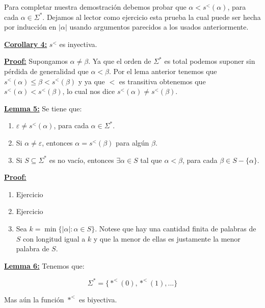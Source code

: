    \par Para completar nuestra demostración debemos probar que $\alpha < s^{<}(\alpha)$, para cada $\alpha \in
    \Sigma ^{\ast}$. Dejamos al lector como ejercicio esta prueba la cual puede ser hecha por inducción en $\left\vert
    \alpha \right\vert$ usando argumentos parecidos a los usados anteriormente.

  \QED


  \textbf{\underline{Corollary 4:}} $s^{<}$ es inyectiva.

  \textbf{\underline{Proof:}} Supongamos $\alpha \neq \beta$. Ya que el orden de $\Sigma^{\ast}$ es total podemos
    suponer sin pérdida de generalidad que $\alpha < \beta$. Por el lema anterior tenemos que $s^{<}(\alpha) \leq \beta
    < s^{<}(\beta)$ y ya que $<$ es transitiva obtenemos que $s^{<}(\alpha)< s^{<}(\beta)$, lo cual nos dice $s^{<}
    (\alpha) \neq s^{<}(\beta)$.

  \QED


  \textbf{\underline{Lemma 5:}} Se tiene que:
    \begin{enumerate}
      \item $\varepsilon \neq s^{<}(\alpha)$, para cada $\alpha \in \Sigma^{\ast}$.
      \item Si $\alpha \neq \varepsilon$, entonces $\alpha = s^{<}(\beta)$ para algún $\beta$.
      \item Si $S\subseteq \Sigma^{\ast}$ es no vacío, entonces $\exists \alpha \in S$ tal que $\alpha < \beta$, para
      cada $\beta \in S-\{\alpha\}$.
    \end{enumerate}

  \textbf{\underline{Proof:}}

    \begin{enumerate}
      \item Ejercicio
      \item Ejercicio
      \item Sea $k = \min \{\left\vert \alpha \right\vert: \alpha \in S\}$. Notese que hay una cantidad finita de
      palabras de $S$ con longitud igual a $k$ y que la menor de ellas es justamente la menor palabra de $S$.
    \end{enumerate}

  \QED


  \textbf{\underline{Lemma 6:}} Tenemos que:

    \[
      \Sigma^{\ast}=\{\ast^{<}(0),\ast^{<}(1), ...\}
    \]

    \par Mas aún la función $\ast^{<}$ es biyectiva.


